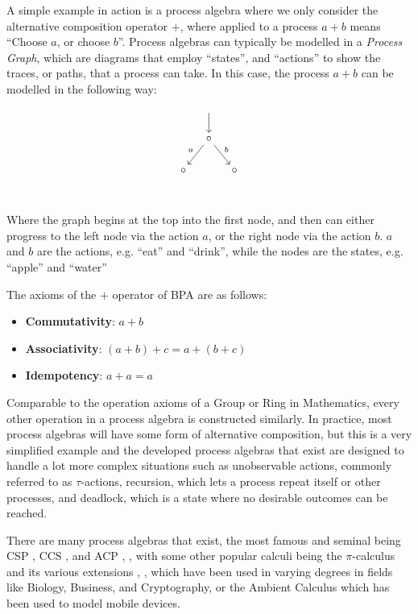 \documentclass[logo,bsc,singlespacing,parskip,online]{infthesis}
\begin{document}
A simple example in action is a process algebra where we only consider the alternative composition operator $+$, where applied to a process $a + b$ means ``Choose $a$, or choose $b$''. Process algebras can typically be modelled in a \textit{Process Graph}, which are diagrams that employ ``states'', and ``actions'' to show the traces, or paths, that a process can take. In this case, the process $a + b$ can be modelled in the following way:

\[\begin{tikzcd}[cramped,column sep=small]
	& {} \\
	& \circ \\
	\circ && \circ \\
	\arrow[from=1-2, to=2-2]
	\arrow["a"', from=2-2, to=3-1]
	\arrow["b", from=2-2, to=3-3]
\end{tikzcd}\]

Where the graph begins at the top into the first node, and then can either progress to the left node via the action $a$, or the right node via the action $b$. $a$ and $b$ are the actions, e.g. ``eat'' and ``drink'', while the nodes are the states, e.g. ``apple'' and ``water''

The axioms of the $+$ operator of BPA are as follows:
\begin{itemize}
    \item \textbf{Commutativity}: $a + b$
    \item \textbf{Associativity}: $(a + b) + c = a + (b + c)$
    \item \textbf{Idempotency}: $a + a = a$
\end{itemize}
Comparable to the operation axioms of a Group or Ring in Mathematics, every other operation in a process algebra is constructed similarly. In practice, most process algebras will have some form of alternative composition, but this is a very simplified example and the developed process algebras that exist are designed to handle a lot more complex situations such as unobservable actions, commonly referred to as $\tau$-actions, recursion, which lets a process repeat itself or other processes, and deadlock, which is a state where no desirable outcomes can be reached.

There are many process algebras that exist, the most famous and seminal being CSP \citep{brookes_theory_1984}, CCS \citep{milner_calculus_1980}, and ACP \citep{bergstra_process_1984}, \citep{bergstra_acp_1989}, with some other popular calculi being the $\pi$-calculus and its various extensions  \citep{engberg_calculus_1986}, \citep{parrow_fusion_1998}, \citep{abadi_calculus_1999} which have been used in varying degrees in fields like Biology, Business, and Cryptography, or the Ambient Calculus \citep{cardelli_mobile_1998} which has been used to model mobile devices.
\end{document}
